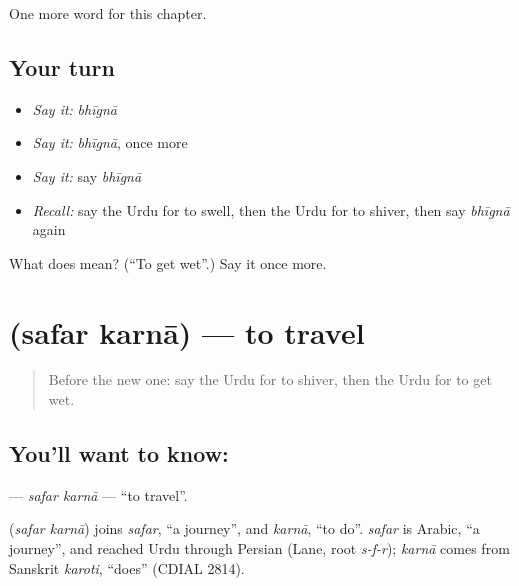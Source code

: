 \begin{grammarlens}[title={What you've built}]
One more word for this chapter.
\end{grammarlens}

\subsection*{Your turn}
\begin{itemize}
\raggedright
  \item \emph{Say it:} \emph{bhīgnā}
  \item \emph{Say it:} \emph{bhīgnā}, once more
  \item \emph{Say it:} say \emph{bhīgnā}
  \item \emph{Recall:} say the Urdu for to swell, then the Urdu for to shiver, then say \emph{bhīgnā} again
\end{itemize}

\begin{tcolorbox}[breakable,colback=teal!4,colframe=teal!35!black,title={Before you move on}]
What does  mean? (\textquotedblleft{}To get wet\textquotedblright{}.) Say it once more.
\end{tcolorbox}
\section[\texorpdfstring{\ur{سفر} \ur{کرنا} (safar karnā)}{سفر کرنا (safar karnā)}]{  (safar karnā) — to travel}

\label{lesson:UR-C184-safar-karna}



\begin{quote}
Before the new one: say the Urdu for to shiver, then the Urdu for to get wet.
\end{quote}

\subsection*{You'll want to know:  }
\textbf{ } — \emph{safar karnā} — \textquotedblleft{}to travel\textquotedblright{}.

\begin{cousinweb}
\textbf{ } (\emph{safar karnā}) joins \emph{safar}, \textquotedblleft{}a journey\textquotedblright{}, and \emph{karnā}, \textquotedblleft{}to do\textquotedblright{}. \emph{safar} is Arabic, \textquotedblleft{}a journey\textquotedblright{}, and reached Urdu through Persian (Lane, root \emph{s-f-r}); \emph{karnā} comes from Sanskrit \emph{karoti}, \textquotedblleft{}does\textquotedblright{} (CDIAL 2814).
\end{cousinweb}


